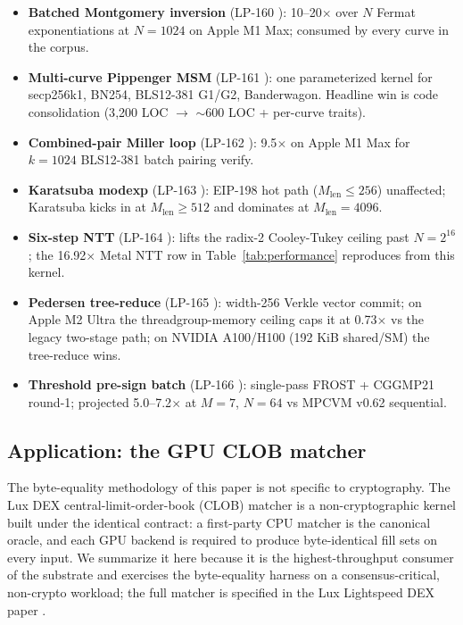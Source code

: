\begin{itemize}
\item \textbf{Batched Montgomery inversion} (LP-160 \cite{lp160}): 10--20$\times$ over $N$ Fermat exponentiations at $N=1024$ on Apple M1 Max; consumed by every curve in the corpus.
\item \textbf{Multi-curve Pippenger MSM} (LP-161 \cite{lp161}): one parameterized kernel for secp256k1, BN254, BLS12-381 G1/G2, Banderwagon. Headline win is code consolidation (3{,}200 LOC $\rightarrow{}$ $\sim$600 LOC + per-curve traits).
\item \textbf{Combined-pair Miller loop} (LP-162 \cite{lp162}): 9.5$\times$ on Apple M1 Max for $k=1024$ BLS12-381 batch pairing verify.
\item \textbf{Karatsuba modexp} (LP-163 \cite{lp163}): EIP-198 hot path ($M_{\text{len}} \le 256$) unaffected; Karatsuba kicks in at $M_{\text{len}} \ge 512$ and dominates at $M_{\text{len}} = 4096$.
\item \textbf{Six-step NTT} (LP-164 \cite{lp164}): lifts the radix-2 Cooley-Tukey ceiling past $N = 2^{16}$; the 16.92$\times$ Metal NTT row in Table~\ref{tab:performance} reproduces from this kernel.
\item \textbf{Pedersen tree-reduce} (LP-165 \cite{lp165}): width-256 Verkle vector commit; on Apple M2 Ultra the threadgroup-memory ceiling caps it at 0.73$\times$ vs the legacy two-stage path; on NVIDIA A100/H100 (192 KiB shared/SM) the tree-reduce wins.
\item \textbf{Threshold pre-sign batch} (LP-166 \cite{lp166}): single-pass FROST + CGGMP21 round-1; projected 5.0--7.2$\times$ at $M=7$, $N=64$ vs MPCVM v0.62 sequential.
\end{itemize}

\subsection{Application: the GPU CLOB matcher}
\label{sec:clob-matcher}

The byte-equality methodology of this paper is not specific to
cryptography. The Lux DEX central-limit-order-book (CLOB) matcher is a
non-cryptographic kernel built under the identical contract: a
first-party CPU matcher is the canonical oracle, and each GPU backend is
required to produce byte-identical fill sets on every input. We summarize
it here because it is the highest-throughput consumer of the substrate
and exercises the byte-equality harness on a consensus-critical,
non-crypto workload; the full matcher is specified in the Lux Lightspeed
DEX paper \cite{luxlightspeeddex}.

